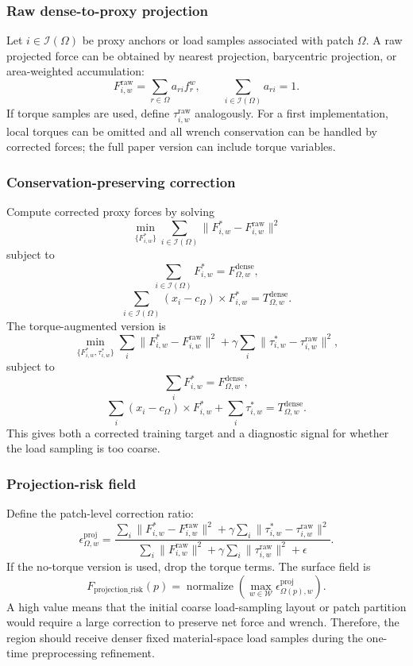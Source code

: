 \documentclass[11pt,a4paper]{article}
\newcommand{\normalize}{\operatorname{normalize}}
\begin{document}
\subsubsection{Raw dense-to-proxy projection}
Let $i\in\mathcal{I}(\Omega)$ be proxy anchors or load samples associated with patch $\Omega$. A raw projected force can be obtained by nearest projection, barycentric projection, or area-weighted accumulation:
\[
F_{i,w}^{\mathrm{raw}}=\sum_{r\in\Omega} a_{ri} f_r^w,
\qquad
\sum_{i\in\mathcal{I}(\Omega)}a_{ri}=1.
\]
If torque samples are used, define $\tau_{i,w}^{\mathrm{raw}}$ analogously. For a first implementation, local torques can be omitted and all wrench conservation can be handled by corrected forces; the full paper version can include torque variables.

\subsubsection{Conservation-preserving correction}
Compute corrected proxy forces by solving
\[
\min_{\{F_{i,w}^*\}}
\sum_{i\in\mathcal{I}(\Omega)}\|F_{i,w}^*-F_{i,w}^{\mathrm{raw}}\|^2
\]
subject to
\[
\sum_{i\in\mathcal{I}(\Omega)}F_{i,w}^*=F_{\Omega,w}^{\mathrm{dense}},
\]
\[
\sum_{i\in\mathcal{I}(\Omega)}(x_i-c_\Omega)\times F_{i,w}^*=T_{\Omega,w}^{\mathrm{dense}}.
\]
The torque-augmented version is
\[
\min_{\{F_{i,w}^*,\tau_{i,w}^*\}}
\sum_i\|F_{i,w}^*-F_{i,w}^{\mathrm{raw}}\|^2
+\gamma\sum_i\|\tau_{i,w}^*-\tau_{i,w}^{\mathrm{raw}}\|^2,
\]
subject to
\[
\sum_iF_{i,w}^*=F_{\Omega,w}^{\mathrm{dense}},
\]
\[
\sum_i(x_i-c_\Omega)\times F_{i,w}^*+\sum_i\tau_{i,w}^*=T_{\Omega,w}^{\mathrm{dense}}.
\]
This gives both a corrected training target and a diagnostic signal for whether the load sampling is too coarse.

\subsubsection{Projection-risk field}
Define the patch-level correction ratio:
\[
\epsilon_{\Omega,w}^{\mathrm{proj}}=
\frac{
\sum_i\|F_{i,w}^*-F_{i,w}^{\mathrm{raw}}\|^2
+\gamma\sum_i\|\tau_{i,w}^*-\tau_{i,w}^{\mathrm{raw}}\|^2
}{
\sum_i\|F_{i,w}^{\mathrm{raw}}\|^2
+\gamma\sum_i\|\tau_{i,w}^{\mathrm{raw}}\|^2
+\epsilon
}.
\]
If the no-torque version is used, drop the torque terms. The surface field is
\[
F_{\mathrm{projection\_risk}}(p)=
\normalize\left(
\max_{w\in\mathcal{W}}
\epsilon_{\Omega(p),w}^{\mathrm{proj}}
\right).
\]
A high value means that the initial coarse load-sampling layout or patch partition would require a large correction to preserve net force and wrench. Therefore, the region should receive denser fixed material-space load samples during the one-time preprocessing refinement.
\end{document}
